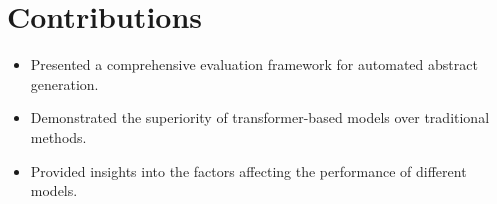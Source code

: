 \documentclass{article}
\begin{document}
\section{Contributions}
\begin{itemize}
    \item Presented a comprehensive evaluation framework for automated abstract generation.
    \item Demonstrated the superiority of transformer-based models over traditional methods.
    \item Provided insights into the factors affecting the performance of different models.
\end{itemize}
\end{document}
